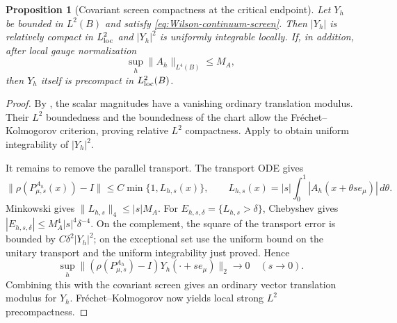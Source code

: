 \documentclass[11pt]{article}
\numberwithin{equation}{section}
\newtheorem{proposition}[proposition]{Proposition}
\theoremstyle{definition}
\theoremstyle{remark}
\newcommand{\norm}[1]{\lVert#1\rVert}
\begin{document}
\begin{proposition}[Covariant screen compactness at the critical endpoint]
\label{prop:Wilson-screen-compactness}
Let $Y_h$ be bounded in $L^2(B)$ and satisfy
\eqref{eq:Wilson-continuum-screen}.  Then $|Y_h|$ is relatively compact in
$L^2_{\rm loc}$ and $|Y_h|^2$ is uniformly integrable locally.  If, in
addition, after local gauge normalization
\begin{equation}
 \sup_h\norm{A_h}_{L^4(B)}\le M_A,
 \label{eq:critical-A4-bound}
\end{equation}
then $Y_h$ itself is precompact in $L^2_{\rm loc}(B)$.
\end{proposition}
\begin{proof}
By , the scalar magnitudes have a vanishing
ordinary translation modulus.  Their $L^2$ boundedness and the boundedness of
the chart allow the Fr\'echet--Kolmogorov criterion, proving relative
$L^2$ compactness.  Apply  to obtain uniform
integrability of $|Y_h|^2$.

It remains to remove the parallel transport.  The transport ODE gives
\begin{equation}
 \norm{\rho(P^{A_h}_{\mu,s}(x))-I}
 \le C\min\{1,L_{h,s}(x)\},
 \qquad
 L_{h,s}(x)=|s|\int_0^1
 |A_h(x+\theta s e_\mu)|\,d\theta.
 \label{eq:short-line-integral}
\end{equation}
Minkowski gives $\norm{L_{h,s}}_4\le |s|M_A$.  For
$E_{h,s,\delta}=\{L_{h,s}>\delta\}$, Chebyshev gives
$|E_{h,s,\delta}|\le M_A^4|s|^4\delta^{-4}$.  On the complement, the square
of the transport error is bounded by $C\delta^2|Y_h|^2$; on the exceptional
set use the uniform bound on the unitary transport and the uniform
integrability just proved.  Hence
\begin{equation}
 \sup_h\norm{(\rho(P^{A_h}_{\mu,s})-I)
 Y_h(\cdot+s e_\mu)}_2\longrightarrow0
 \quad(s\to0).
 \label{eq:short-transport-harmless}
\end{equation}
Combining this with the covariant screen gives an ordinary vector translation
modulus for $Y_h$.  Fr\'echet--Kolmogorov now yields local strong $L^2$
precompactness.
\end{proof}
\end{document}

